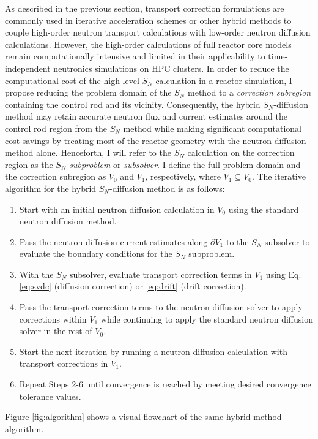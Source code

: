 As described in the previous section, transport correction formulations are commonly used in
iterative acceleration schemes or other hybrid methods to couple high-order neutron transport
calculations with low-order neutron diffusion calculations. However, the high-order calculations of
full reactor core models remain computationally intensive and limited in their applicability to
time-independent neutronics simulations on \gls{HPC} clusters.
In order to reduce the computational cost of the high-level $S_N$ calculation in a reactor
simulation, I propose reducing the problem domain of the $S_N$ method to a
\textit{correction subregion} containing the control rod
and its vicinity. Consequently, the hybrid $S_N$-diffusion method may retain accurate neutron flux
and current estimates around the control rod region from the $S_N$ method while making significant
computational cost savings by treating most of the reactor geometry with the neutron diffusion
method alone. Henceforth, I will refer to the $S_N$ calculation on the correction
region as the $S_N$ \textit{subproblem} or \textit{subsolver}. I define the full problem
domain and the correction subregion as $V_0$ and $V_1$, respectively, where
$V_1\subseteq V_0$. The iterative algorithm for the hybrid $S_N$-diffusion method is as follows:
%
\begin{enumerate}
  \item Start with an initial neutron diffusion calculation in $V_0$ using the standard neutron
    diffusion method.
  \item Pass the neutron diffusion current estimates along
    $\partial V_1$ to the $S_N$ subsolver to evaluate the boundary conditions for the $S_N$
    subproblem.
  \item With the $S_N$ subsolver, evaluate transport correction terms in $V_1$ using Eq.
    \ref{eq:svdc} (diffusion correction) or \ref{eq:drift} (drift correction).
  \item Pass the transport correction terms to the neutron diffusion solver to apply corrections
    within $V_1$ while continuing to apply the standard neutron diffusion solver
    in the rest of $V_0$.
  \item Start the next iteration by running a neutron diffusion calculation with transport
    corrections in $V_1$.
  \item Repeat Steps 2-6 until convergence is reached by meeting desired convergence tolerance
    values.
\end{enumerate}
%
Figure \ref{fig:algorithm} shows a visual flowchart of the same hybrid method algorithm.

